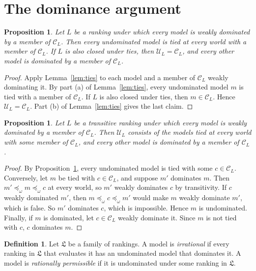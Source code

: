 \documentclass[11pt]{article}
\newtheorem{proposition}[theorem]{Proposition}
\theoremstyle{definition}
\newtheorem{definition}[theorem]{Definition}
\newcommand{\C}{\mathcal C}
\newcommand{\U}{\mathcal U}
\newcommand{\Lf}{\mathfrak L}
\begin{document}
\section{The dominance argument}\label{sec:conclusion}

\begin{proposition}\label{prop:conclusion}
Let $L$ be a ranking under which every model is weakly dominated by a member of $\C_L$. Then every undominated model is tied at every world with a member of $\C_L$. If $L$ is also closed under ties, then $\U_L=\C_L$, and every other model is dominated by a member of $\C_L$.
\end{proposition}
\begin{proof}
Apply Lemma~\ref{lem:ties} to each model and a member of $\C_L$ weakly dominating it. By part (a) of Lemma~\ref{lem:ties}, every undominated model $m$ is tied with a member of $\C_L$. If $L$ is also closed under ties, then $m\in\C_L$. Hence $\U_L=\C_L$. Part (b) of Lemma~\ref{lem:ties} gives the last claim.
\end{proof}

\begin{proposition}\label{prop:profiles}
Let $L$ be a transitive ranking under which every model is weakly dominated by a member of $\C_L$. Then $\U_L$ consists of the models tied at every world with some member of $\C_L$, and every other model is dominated by a member of $\C_L$.
\end{proposition}
\begin{proof}
By Proposition~\ref{prop:conclusion}, every undominated model is tied with some $c\in\C_L$. Conversely, let $m$ be tied with $c\in\C_L$, and suppose $m'$ dominates $m$. Then $m'\preceq_\omega m\preceq_\omega c$ at every world, so $m'$ weakly dominates $c$ by transitivity. If $c$ weakly dominated $m'$, then $m\preceq_\omega c\preceq_\omega m'$ would make $m$ weakly dominate $m'$, which is false. So $m'$ dominates $c$, which is impossible. Hence $m$ is undominated. Finally, if $m$ is dominated, let $c\in\C_L$ weakly dominate it. Since $m$ is not tied with $c$, $c$ dominates $m$.
\end{proof}

\begin{definition}\label{def:permissibility}
Let $\Lf$ be a family of rankings. A model is \emph{irrational} if every ranking in $\Lf$ that evaluates it has an undominated model that dominates it. A model is \emph{rationally permissible} if it is undominated under some ranking in $\Lf$.
\end{definition}
\end{document}
